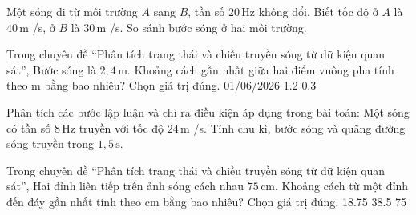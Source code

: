 \begin{ex}
Một sóng đi từ môi trường $A$ sang $B$, tần số $20\,\text{Hz}$ không đổi. Biết tốc độ ở $A$ là $40\,\text{m}$ /s, ở $B$ là $30\,\text{m}$ /s. So sánh bước sóng ở hai môi trường.
\choiceTF

\end{ex}

\begin{ex}
Trong chuyên đề “Phân tích trạng thái và chiều truyền sóng từ dữ kiện quan sát”, Bước sóng là $2,4\,\text{m}$. Khoảng cách gần nhất giữa hai điểm vuông pha tính theo m bằng bao nhiêu? Chọn giá trị đúng.
\choice
{01/06/2026}
{}
{1.2}
{0.3}
\end{ex}

\begin{ex}
Phân tích các bước lập luận và chỉ ra điều kiện áp dụng trong bài toán: Một sóng có tần số $8\,\text{Hz}$ truyền với tốc độ $24\,\text{m}$ /s. Tính chu kì, bước sóng và quãng đường sóng truyền trong $1,5\,\text{s}$.
\choiceTF

\end{ex}

\begin{ex}
Trong chuyên đề “Phân tích trạng thái và chiều truyền sóng từ dữ kiện quan sát”, Hai đỉnh liên tiếp trên ảnh sóng cách nhau $75\,\text{cm}$. Khoảng cách từ một đỉnh đến đáy gần nhất tính theo cm bằng bao nhiêu? Chọn giá trị đúng.
\choice
{18.75}
{38.5}
{}
{75}
\end{ex}

